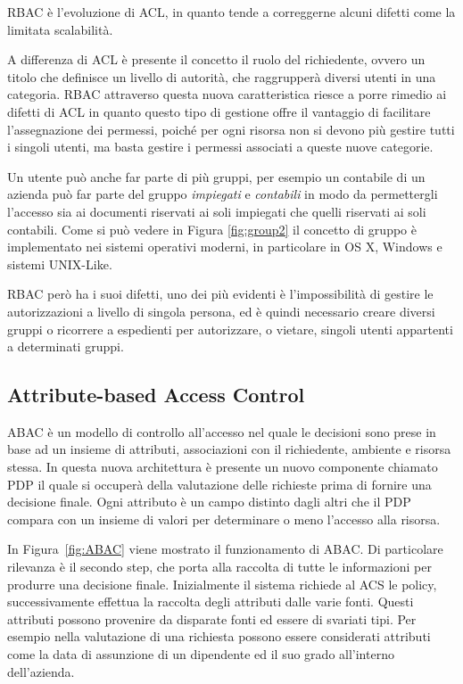 \ac{RBAC} è l'evoluzione di \ac{ACL}, in quanto tende a correggerne alcuni difetti come la limitata scalabilità. \par
A differenza di \ac{ACL} è presente il concetto il ruolo del richiedente, ovvero un titolo che definisce un livello di autorità, che raggrupperà diversi utenti in una categoria. 
\ac{RBAC} attraverso questa nuova caratteristica riesce a porre rimedio ai difetti di \ac{ACL} in quanto
questo tipo di gestione offre il vantaggio di facilitare l'assegnazione dei permessi, poiché per ogni risorsa non si devono più gestire tutti i singoli utenti, ma basta gestire i permessi associati a queste nuove categorie. 


Un utente può anche far parte di più gruppi, per esempio un contabile di un azienda può far parte del gruppo \textit{impiegati} e \textit{contabili} in modo da permettergli l'accesso sia ai documenti riservati ai soli impiegati che quelli riservati ai soli contabili.
Come si può vedere in Figura \ref{fig:group2} il concetto di gruppo è implementato nei sistemi operativi moderni, in particolare in OS X, Windows e sistemi UNIX-Like.

\ac{RBAC} però ha i suoi difetti, uno dei più evidenti è l'impossibilità di gestire le autorizzazioni a livello di singola persona, ed è quindi necessario creare diversi gruppi o ricorrere a espedienti per autorizzare, o vietare, singoli utenti appartenti a determinati gruppi.


\subsection*{Attribute-based Access Control } %
\label{sub:attribute_based_access_control_}

\ac{ABAC} è un modello di controllo all'accesso  nel quale le decisioni sono prese in base ad un insieme 
di attributi, associazioni con il richiedente, ambiente e risorsa stessa.
In questa nuova architettura è presente un nuovo componente chiamato \ac{PDP} il quale si occuperà della valutazione delle richieste prima di fornire una decisione finale.
Ogni attributo è un campo distinto dagli altri che il \ac{PDP} compara con un insieme di valori per determinare o meno l'accesso alla risorsa. 

In Figura~\ref{fig:ABAC} viene mostrato il funzionamento di \ac{ABAC}. Di particolare rilevanza è il secondo step, che porta alla raccolta di tutte le informazioni per produrre una decisione finale.
Inizialmente il sistema richiede al \ac{ACS} le policy, successivamente effettua la raccolta degli attributi dalle varie fonti.
Questi attributi possono provenire da disparate fonti ed essere di svariati tipi. Per esempio nella valutazione di una richiesta possono essere considerati attributi come la data di assunzione di un dipendente ed il suo grado all'interno dell'azienda. 


